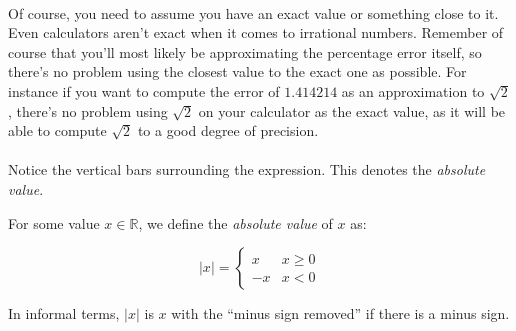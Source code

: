 \documentclass[12pt, a4paper, titlepage, twoside]{article}
\newcommand*{\R}{\mathbb{R}}
\begin{document}
	\paragraph{}
	Of course, you need to assume you have an exact value or something close to it. Even calculators aren't
	exact when it comes to irrational numbers. Remember of course that you'll most likely be approximating
	the percentage error itself, so there's no problem using the closest value to the exact one as possible.
	For instance if you want to compute the error of $1.414214$ as an approximation to $\sqrt{2}$, there's no problem
	using $\sqrt{2}$ on your calculator as the exact value, as it will be able to compute $\sqrt{2}$ to a good degree of
	precision.
	
	\paragraph{}
	Notice the vertical bars surrounding the expression. This denotes the \textit{absolute value}.\\
	
	\begin{kp}
		For some value $x \in \R$, we define the \textit{absolute value} of $x$ as:
		
		$$|x| = 
		\begin{cases} 
			x & x \geqslant 0\\
			-x & x < 0
		\end{cases}$$
		
		In informal terms, $|x|$ is $x$ with the ``minus sign removed'' if there is a minus sign.
	\end{kp}
	
	\hfill
	
\end{document}
